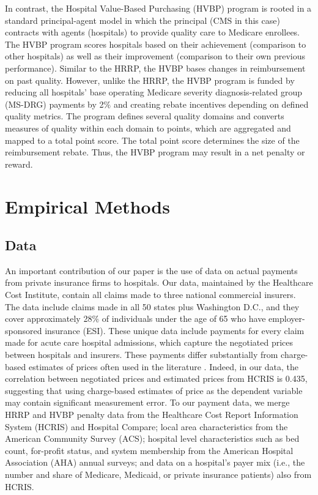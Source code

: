 \documentclass[12pt]{article}
\begin{document}
In contrast, the Hospital Value-Based Purchasing (HVBP) program is rooted in a standard principal-agent model in which the principal (CMS in this case) contracts with agents (hospitals) to provide quality care to Medicare enrollees. The HVBP program scores hospitals based on their achievement (comparison to other hospitals) as well as their improvement (comparison to their own previous performance).  Similar to the HRRP, the HVBP bases changes in reimbursement on past quality.  However, unlike the HRRP, the HVBP program is funded by reducing all hospitals' base operating Medicare severity diagnosis-related group (MS-DRG) payments by 2$\%$ and creating rebate incentives depending on defined quality metrics.  The program defines several quality domains and converts measures of quality within each domain to points, which are aggregated and mapped to a total point score.  The total point score determines the size of the reimbursement rebate.  Thus, the HVBP program may result in a net penalty or reward.


\section{Empirical Methods}
\label{sec:Empirical}


\subsection{Data}
An important contribution of our paper is the use of data on actual payments from private insurance firms to hospitals.  Our data, maintained by the Healthcare Cost Institute, contain all claims made to three national commercial insurers.  The data include claims made in all 50 states plus Washington D.C., and they cover approximately 28$\%$ of individuals under the age of 65 who have employer-sponsored insurance (ESI).  These unique data include payments for every claim made for acute care hospital admissions, which capture the negotiated prices between hospitals and insurers.  These payments differ substantially from charge-based estimates of prices often used in the literature \citep{dafny2009,dranove2017}. Indeed, in our data, the correlation between negotiated prices and estimated prices from HCRIS is 0.435, suggesting that using charge-based estimates of price as the dependent variable may contain significant measurement error.  To our payment data, we merge HRRP and HVBP penalty data from the Healthcare Cost Report Information System (HCRIS) and Hospital Compare; local area characteristics from the American Community Survey (ACS); hospital level characteristics such as bed count, for-profit status, and system membership from the American Hospital Association (AHA) annual surveys; and data on a hospital's payer mix (i.e., the number and share of Medicare, Medicaid, or private insurance patients) also from HCRIS.
\end{document}
